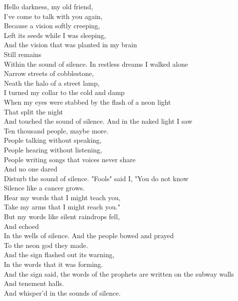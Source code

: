\begin{flushleft}
Hello darkness, my old friend,\\
I've come to talk with you again,\\
Because a vision softly creeping,\\
Left its seeds while I was sleeping,\\
And the vision that was planted in my brain\\
Still remains\\
Within the sound of silence.
\hops
In restless dreams I walked alone\\
Narrow streets of cobblestone,\\
Neath the halo of a street lamp,\\
I turned my collar to the cold and damp\\
When my eyes were stabbed by the flash of a neon light\\
That split the night\\
And touched the sound of silence.
\hops
And in the naked light I saw\\
Ten thousand people, maybe more.\\
People talking without speaking,\\
People hearing without listening,\\
People writing songs that voices never share\\
And no one dared\\
Disturb the sound of silence.
\hops
"Fools" said I, "You do not know\\
Silence like a cancer grows.\\
Hear my words that I might teach you,\\
Take my arms that I might reach you."\\
But my words like silent raindrops fell,\\
And echoed\\
In the wells of silence.
\hops
And the people bowed and prayed\\
To the neon god they made.\\
And the sign flashed out its warning,\\
In the words that it was forming.\\
And the sign said, the words of the prophets are written on the subway walls\\
And tenement halls.\\
And whisper'd in the sounds of silence. 
\end{flushleft}
\newpage